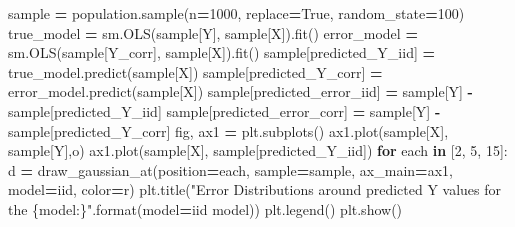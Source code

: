 \documentclass[
]{book}
\newenvironment{Shaded}{\begin{snugshade}}{\end{snugshade}}
\newcommand{\BuiltInTok}[1]{#1}
\newcommand{\ControlFlowTok}[1]{\textcolor[rgb]{0.13,0.29,0.53}{\textbf{#1}}}
\newcommand{\DecValTok}[1]{\textcolor[rgb]{0.00,0.00,0.81}{#1}}
\newcommand{\KeywordTok}[1]{\textcolor[rgb]{0.13,0.29,0.53}{\textbf{#1}}}
\newcommand{\NormalTok}[1]{#1}
\newcommand{\OperatorTok}[1]{\textcolor[rgb]{0.81,0.36,0.00}{\textbf{#1}}}
\newcommand{\SpecialCharTok}[1]{\textcolor[rgb]{0.00,0.00,0.00}{#1}}
\newcommand{\StringTok}[1]{\textcolor[rgb]{0.31,0.60,0.02}{#1}}
\newcommand{\VariableTok}[1]{\textcolor[rgb]{0.00,0.00,0.00}{#1}}
\theoremstyle{definition}
\theoremstyle{definition}
\theoremstyle{definition}
\theoremstyle{remark}
\begin{document}
\begin{Shaded}
\begin{Highlighting}[]
\NormalTok{sample }\OperatorTok{=}\NormalTok{ population.sample(n}\OperatorTok{=}\DecValTok{1000}\NormalTok{, replace}\OperatorTok{=}\VariableTok{True}\NormalTok{, random\_state}\OperatorTok{=}\DecValTok{100}\NormalTok{)}
\NormalTok{true\_model }\OperatorTok{=}\NormalTok{ sm.OLS(sample[}\StringTok{\textquotesingle{}Y\textquotesingle{}}\NormalTok{], sample[}\StringTok{\textquotesingle{}X\textquotesingle{}}\NormalTok{]).fit()}
\NormalTok{error\_model }\OperatorTok{=}\NormalTok{ sm.OLS(sample[}\StringTok{\textquotesingle{}Y\_corr\textquotesingle{}}\NormalTok{], sample[}\StringTok{\textquotesingle{}X\textquotesingle{}}\NormalTok{]).fit()}
\NormalTok{sample[}\StringTok{\textquotesingle{}predicted\_Y\_iid\textquotesingle{}}\NormalTok{] }\OperatorTok{=}\NormalTok{ true\_model.predict(sample[}\StringTok{\textquotesingle{}X\textquotesingle{}}\NormalTok{])}
\NormalTok{sample[}\StringTok{\textquotesingle{}predicted\_Y\_corr\textquotesingle{}}\NormalTok{] }\OperatorTok{=}\NormalTok{ error\_model.predict(sample[}\StringTok{\textquotesingle{}X\textquotesingle{}}\NormalTok{])}
\NormalTok{sample[}\StringTok{\textquotesingle{}predicted\_error\_iid\textquotesingle{}}\NormalTok{] }\OperatorTok{=}\NormalTok{ sample[}\StringTok{\textquotesingle{}Y\textquotesingle{}}\NormalTok{] }\OperatorTok{{-}}\NormalTok{ sample[}\StringTok{\textquotesingle{}predicted\_Y\_iid\textquotesingle{}}\NormalTok{]}
\NormalTok{sample[}\StringTok{\textquotesingle{}predicted\_error\_corr\textquotesingle{}}\NormalTok{] }\OperatorTok{=}\NormalTok{ sample[}\StringTok{\textquotesingle{}Y\textquotesingle{}}\NormalTok{] }\OperatorTok{{-}}\NormalTok{ sample[}\StringTok{\textquotesingle{}predicted\_Y\_corr\textquotesingle{}}\NormalTok{]}
\NormalTok{fig, ax1 }\OperatorTok{=}\NormalTok{ plt.subplots()}
\NormalTok{ax1.plot(sample[}\StringTok{\textquotesingle{}X\textquotesingle{}}\NormalTok{], sample[}\StringTok{\textquotesingle{}Y\textquotesingle{}}\NormalTok{],}\StringTok{\textquotesingle{}o\textquotesingle{}}\NormalTok{)}
\NormalTok{ax1.plot(sample[}\StringTok{\textquotesingle{}X\textquotesingle{}}\NormalTok{], sample[}\StringTok{\textquotesingle{}predicted\_Y\_iid\textquotesingle{}}\NormalTok{])}
\ControlFlowTok{for}\NormalTok{ each }\KeywordTok{in}\NormalTok{ [}\DecValTok{2}\NormalTok{, }\DecValTok{5}\NormalTok{,  }\DecValTok{15}\NormalTok{]:}
\NormalTok{    d }\OperatorTok{=}\NormalTok{ draw\_gaussian\_at(position}\OperatorTok{=}\NormalTok{each, sample}\OperatorTok{=}\NormalTok{sample, ax\_main}\OperatorTok{=}\NormalTok{ax1, model}\OperatorTok{=}\StringTok{\textquotesingle{}iid\textquotesingle{}}\NormalTok{, color}\OperatorTok{=}\StringTok{\textquotesingle{}r\textquotesingle{}}\NormalTok{)}
\NormalTok{plt.title(}\StringTok{"Error Distributions around predicted Y values for the }\SpecialCharTok{\{model:\}}\StringTok{"}\NormalTok{.}\BuiltInTok{format}\NormalTok{(model}\OperatorTok{=}\StringTok{\textquotesingle{}iid model\textquotesingle{}}\NormalTok{))}
\NormalTok{plt.legend()}
\NormalTok{plt.show()}
\end{Highlighting}
\end{Shaded}
\end{document}
